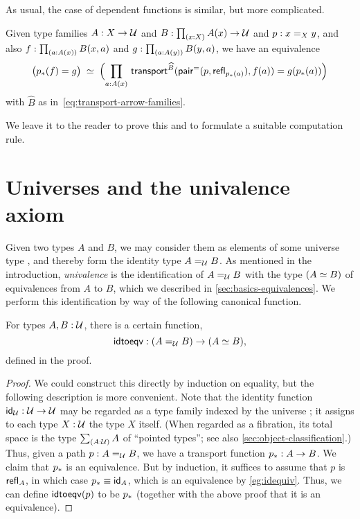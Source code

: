 As usual, the case of dependent functions is similar, but more complicated.

\begin{lem}\label{thm:dpath-forall}
  Given type families $A:X\to\type$ and $B:\prd{x:X} A(x)\to\type$ and $p:\id[X]xy$, and also $f:\prd{a:A(x)} B(x,a)$ and $g:\prd{a:A(y)} B(y,a)$, we have an equivalence
  \[ \eqvspaced{ \big(\trans{p}{f} = {g}\big) } { \Parens{\prd{a:A(x)}  \transfib{\widehat{B}}{\pairpath(p,\refl{\trans pa})}{f(a)} = g(\trans{p}{a}) } } \]
  with $\widehat{B}$ as in~\eqref{eq:transport-arrow-families}.
\end{lem}

We leave it to the reader to prove this and to formulate a suitable computation rule.

%
%
%

\section{Universes and the univalence axiom}
\label{sec:compute-universe}

%
%
Given two types $A$ and $B$, we may consider them as elements of some universe type \type, and thereby form the identity type $\id[\type]AB$.
As mentioned in the introduction, \emph{univalence} is the identification of $\id[\type]AB$ with the type $(\eqv AB)$ of equivalences from $A$ to $B$, which we described in \autoref{sec:basics-equivalences}.
We perform this identification by way of the following canonical function.

\begin{lem}\label{thm:idtoeqv}
  For types $A,B:\type$, there is a certain function,
  \begin{equation}\label{eq:uidtoeqv}
    \idtoeqv : (\id[\type]AB) \to (\eqv A B),
  \end{equation}
  defined in the proof.
\end{lem}
\begin{proof}
  We could construct this directly by induction on equality, but the following description is more convenient.
  Note that the identity function $\idfunc[\type]:\type\to\type$ may be regarded as a type family indexed by the universe \type; it assigns to each type $X:\type$ the type $X$ itself.
  (When regarded as a fibration, its total space is the type $\sm{A:\type}A$ of ``pointed types''; see also \autoref{sec:object-classification}.)
  Thus, given a path $p:A =_\type B$, we have a transport function $\transf{p}:A \to B$.
  We claim that $\transf{p}$ is an equivalence.
  But by induction, it suffices to assume that $p$ is $\refl A$, in which case $\transf{p} \jdeq \idfunc[A]$, which is an equivalence by \autoref{eg:idequiv}.
  Thus, we can define $\idtoeqv(p)$ to be $\transf{p}$ (together with the above proof that it is an equivalence).
\end{proof}

